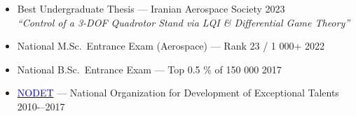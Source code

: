 \documentclass[12pt]{article}
\begin{document}











\begin{itemize}  \itemsep -1pt  %
  \item Best Undergraduate Thesis — Iranian Aerospace Society \hfill 2023\\
        \textit{“Control of a 3-DOF Quadrotor Stand via LQI \& Differential Game Theory”}
  \item National M.Sc.\ Entrance Exam (Aerospace) — Rank 23 / 1 000+ \hfill 2022
  \item National B.Sc.\ Entrance Exam — Top 0.5 \% of 150 000 \hfill2017
  \item \href{https://en.wikipedia.org/wiki/National_Organization_for_Development_of_Exceptional_Talents}{\textcolor{blue}{NODET}} — National Organization for Development of Exceptional Talents \hfill 2010-–2017
\end{itemize}
\end{document}
